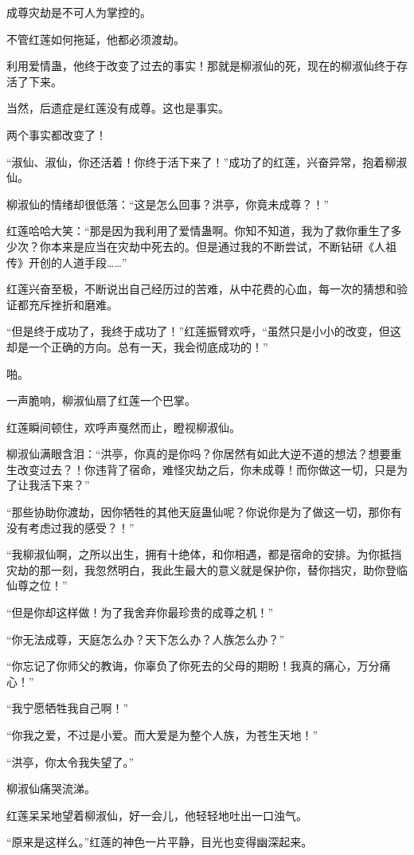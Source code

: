 \begin{this_body}
成尊灾劫是不可人为掌控的。

不管红莲如何拖延，他都必须渡劫。

利用爱情蛊，他终于改变了过去的事实！那就是柳淑仙的死，现在的柳淑仙终于存活了下来。

当然，后遗症是红莲没有成尊。这也是事实。

两个事实都改变了！

“淑仙、淑仙，你还活着！你终于活下来了！”成功了的红莲，兴奋异常，抱着柳淑仙。

柳淑仙的情绪却很低落：“这是怎么回事？洪亭，你竟未成尊？！”

红莲哈哈大笑：“那是因为我利用了爱情蛊啊。你知不知道，我为了救你重生了多少次？你本来是应当在灾劫中死去的。但是通过我的不断尝试，不断钻研《人祖传》开创的人道手段……”

红莲兴奋至极，不断说出自己经历过的苦难，从中花费的心血，每一次的猜想和验证都充斥挫折和磨难。

“但是终于成功了，我终于成功了！”红莲振臂欢呼，“虽然只是小小的改变，但这却是一个正确的方向。总有一天，我会彻底成功的！”

啪。

一声脆响，柳淑仙扇了红莲一个巴掌。

红莲瞬间顿住，欢呼声戛然而止，瞪视柳淑仙。

柳淑仙满眼含泪：“洪亭，你真的是你吗？你居然有如此大逆不道的想法？想要重生改变过去？！你违背了宿命，难怪灾劫之后，你未成尊！而你做这一切，只是为了让我活下来？”

“那些协助你渡劫，因你牺牲的其他天庭蛊仙呢？你说你是为了做这一切，那你有没有考虑过我的感受？！”

“我柳淑仙啊，之所以出生，拥有十绝体，和你相遇，都是宿命的安排。为你抵挡灾劫的那一刻，我忽然明白，我此生最大的意义就是保护你，替你挡灾，助你登临仙尊之位！”

“但是你却这样做！为了我舍弃你最珍贵的成尊之机！”

“你无法成尊，天庭怎么办？天下怎么办？人族怎么办？”

“你忘记了你师父的教诲，你辜负了你死去的父母的期盼！我真的痛心，万分痛心！”

“我宁愿牺牲我自己啊！”

“你我之爱，不过是小爱。而大爱是为整个人族，为苍生天地！”

“洪亭，你太令我失望了。”

柳淑仙痛哭流涕。

红莲呆呆地望着柳淑仙，好一会儿，他轻轻地吐出一口浊气。

“原来是这样么。”红莲的神色一片平静，目光也变得幽深起来。


\end{this_body}
